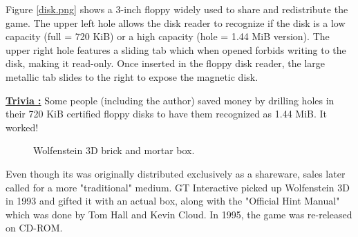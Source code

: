 \documentclass[book.tex]{subfiles}
\begin{document}
\par
\begin{figure}[H]
\centering
\label{disquette}
\end{figure}
\vspace{-10pt}
\par
Figure \ref{disk.png} shows a 3-inch floppy widely used to share and redistribute the game. The upper left hole allows the disk reader to recognize if the disk is a low capacity (full = 720 KiB) or a high capacity (hole = 1.44 MiB version). The upper right hole features a sliding tab which when opened forbids writing to the disk, making it read-only. Once inserted in the floppy disk reader, the large metallic tab slides to the right to expose the magnetic disk.\\
\par
\textbf{\underline{Trivia :}} Some people (including the author) saved money by drilling holes in their 720 KiB certified floppy disks to have them recognized as 1.44 MiB. It worked!\\

\par
\begin{figure}[H]
\centering
{}
\caption{Wolfenstein 3D brick and mortar box.}
\end{figure}
\par
Even though its was originally distributed exclusively as a shareware, sales later called for a more "traditional" medium. GT Interactive picked up Wolfenstein 3D in 1993 and gifted it with an actual box, along with the "Official Hint Manual" which was done by Tom Hall and Kevin Cloud. In 1995, the game was re-released on CD-ROM.\\
\end{document}
